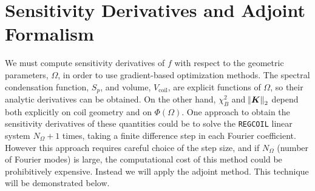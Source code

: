 \documentclass[aps,unsortedaddress]{revtex4-1}
\begin{document}
\section{Sensitivity Derivatives and Adjoint Formalism}
\label{sect_adjoint}
We must compute sensitivity derivatives of $f$ with respect to the geometric parameters, $\Omega$, in order to use gradient-based optimization methods. The spectral condensation function, $S_p$, and volume, $V_{\text{coil}}$, are explicit functions of $\Omega$, so their analytic derivatives can be obtained. On the other hand, $\chi^2_B$ and $\norm{\bm{K}}_2$ depend both explicitly on coil geometry and on $\Phi(\Omega)$. One approach to obtain the sensitivity derivatives of these quantities could be to solve the \texttt{REGCOIL} linear system $N_{\Omega} +1$ times, taking a finite difference step in each Fourier coefficient. However this approach requires careful choice
of the step size, and if $N_{\Omega}$ (number of Fourier modes) is large, the computational cost of this method could be prohibitively expensive. Instead we will apply the adjoint method. This technique will be demonstrated below. 
\end{document}
